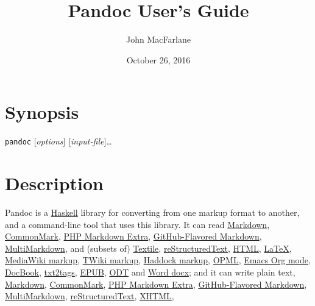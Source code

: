 \documentclass[]{article}
\title{Pandoc User's Guide}
\author{John MacFarlane}
\date{October 26, 2016}
\begin{document}
\maketitle

\section{Synopsis}\label{synopsis}

\texttt{pandoc} {[}\emph{options}{]} {[}\emph{input-file}{]}\ldots{}

\section{Description}\label{description}

Pandoc is a \href{https://www.haskell.org}{Haskell} library for
converting from one markup format to another, and a command-line tool
that uses this library. It can read
\href{http://daringfireball.net/projects/markdown/}{Markdown},
\href{http://commonmark.org}{CommonMark},
\href{https://michelf.ca/projects/php-markdown/extra/}{PHP Markdown
Extra},
\href{https://help.github.com/articles/github-flavored-markdown/}{GitHub-Flavored
Markdown},
\href{http://fletcherpenney.net/multimarkdown/}{MultiMarkdown}, and
(subsets of) \href{http://redcloth.org/textile}{Textile},
\href{http://docutils.sourceforge.net/docs/ref/rst/introduction.html}{reStructuredText},
\href{http://www.w3.org/html/}{HTML},
\href{http://latex-project.org}{LaTeX},
\href{https://www.mediawiki.org/wiki/Help:Formatting}{MediaWiki markup},
\href{http://twiki.org/cgi-bin/view/TWiki/TextFormattingRules}{TWiki
markup},
\href{https://www.haskell.org/haddock/doc/html/ch03s08.html}{Haddock
markup}, \href{http://dev.opml.org/spec2.html}{OPML},
\href{http://orgmode.org}{Emacs Org mode},
\href{http://docbook.org}{DocBook},
\href{http://txt2tags.org}{txt2tags}, \href{http://idpf.org/epub}{EPUB},
\href{http://en.wikipedia.org/wiki/OpenDocument}{ODT} and
\href{http://www.microsoft.com/interop/openup/openxml/default.aspx}{Word
docx}; and it can write plain text,
\href{http://daringfireball.net/projects/markdown/}{Markdown},
\href{http://commonmark.org}{CommonMark},
\href{https://michelf.ca/projects/php-markdown/extra/}{PHP Markdown
Extra},
\href{https://help.github.com/articles/github-flavored-markdown/}{GitHub-Flavored
Markdown},
\href{http://fletcherpenney.net/multimarkdown/}{MultiMarkdown},
\href{http://docutils.sourceforge.net/docs/ref/rst/introduction.html}{reStructuredText},
\href{http://www.w3.org/TR/xhtml1/}{XHTML},
\end{document}
